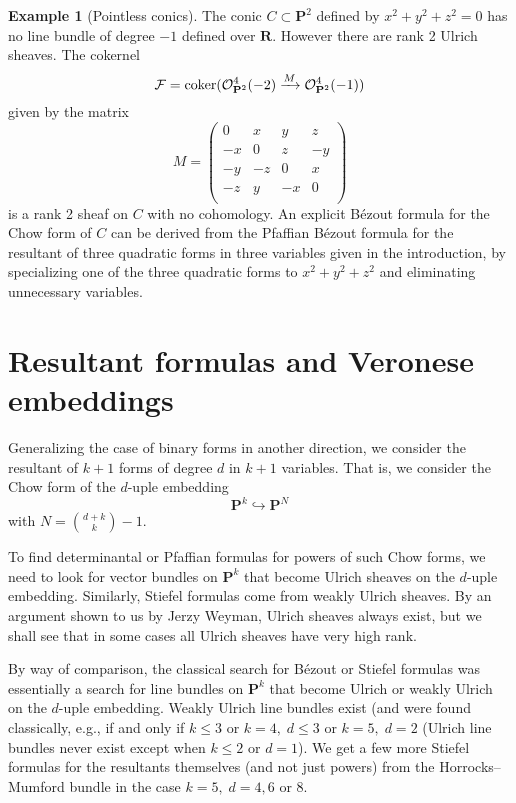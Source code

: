 \documentclass{jams-l}
\theoremstyle{definition}
\newtheorem{example}[theorem]{Example}
\theoremstyle{remark}
\newcommand{\F}{{\mathcal F}}
\newcommand{\cO}{{\mathcal O}}
\newcommand{\PP}{{\mathbf P}}
\newcommand{\RR}{{\mathbf R}}
\newcommand{\coker}{\mathop{\rm coker}}
\newcommand{\rTo}{\xrightarrow}
\begin{document}
\begin{example}[Pointless conics] \label{conic with no points}
The conic $C \subset \PP^2$ defined by $x^2+y^2+z^2=0$ has no line bundle
of degree $-1$ defined over $\RR$. However there are rank 2 Ulrich sheaves.
The cokernel 
\[\F=\coker(\cO_{\PP^2}^4(-2) \rTo{M} \cO_{\PP^2}^4(-1))\]
given by the matrix
\[M= \begin{pmatrix}0 & x & y & z \\
              -x & 0 & z & -y \\
              -y & -z & 0 & x \\
              -z & y & -x & 0 \\ \end{pmatrix}
\]
is a rank 2 sheaf on $C$ with no cohomology. An explicit B\'ezout 
formula for the Chow form of $C$ 
can be derived from the Pfaffian B\'ezout formula for the
resultant of three quadratic forms in three variables given in the
introduction, by specializing one of the three quadratic forms
to $x^2+y^2+z^2$ and eliminating unnecessary variables. 
\end{example} 

\section{Resultant formulas and Veronese embeddings}
\label{Projective spaces}

Generalizing the case of binary forms in another direction,
we consider the resultant of $k+1$ forms of degree $d$
in $k+1$ variables. That is, we consider the Chow
form of the $d$-uple embedding 
\[\PP^k \hookrightarrow \PP^N\] with $N = {d+k \choose k}-1$. 

To find
determinantal or Pfaffian formulas for powers of such Chow forms, we
need to look for vector bundles on $\PP^k$ that become Ulrich sheaves
on the $d$-uple embedding. Similarly, Stiefel formulas come from weakly Ulrich
sheaves.  By an argument shown to us by Jerzy Weyman, Ulrich
sheaves always exist, but we shall see that in
some cases all Ulrich sheaves have very high rank.

\enlargethispage{1\baselineskip}
By way of comparison, the classical search for
B\'ezout or Stiefel formulas was essentially a search for line bundles
on $\PP^k$ that become Ulrich or weakly Ulrich on the $d$-uple
embedding. Weakly Ulrich line bundles exist (and were found
classically, e.g.,
\cite[Chap 13, Prop. 1.6]{Gelfandetal.1994}
if and only if $k\leq 3$ or $k=4,\; d\leq 3$ or $k=5,\;d=2$ (Ulrich line
bundles never exist except when $k\leq 2$ or $d=1$). We get a few more
Stiefel formulas for the resultants themselves (and not just powers)
from the Horrocks--Mumford bundle in the case $k=5,\; d=4,6$ or 8.
\end{document}
